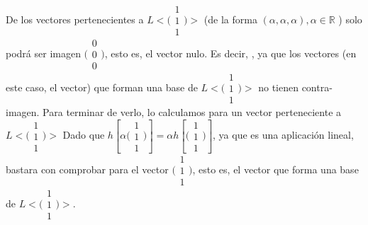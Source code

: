 \documentclass[11pt]{article}
\begin{document}
\begin{question}
\begin{subquestion}
{        De los vectores pertenecientes a $L<\big(\begin{smallmatrix} 1 \\ 1\\ 1 \end{smallmatrix}\big)>$ (de la forma $(\alpha,\alpha,\alpha),\alpha\in\mathbb{R}$ ) solo podrá ser imagen $\big(\begin{smallmatrix} 0 \\ 0\\ 0 \end{smallmatrix}\big)$, esto es, el vector nulo. Es decir, , ya que los vectores (en este caso, el vector) que forman una base de $L<\big(\begin{smallmatrix} 1 \\ 1\\ 1 \end{smallmatrix}\big)>$ no tienen contra-imagen.
        \newline
        \newline
        Para terminar de verlo, lo calculamos para un vector perteneciente a $L<\big(\begin{smallmatrix} 1 \\ 1\\ 1 \end{smallmatrix}\big)>$
        \newline
        Dado que $h\left[\alpha\big(\begin{smallmatrix} 1 \\ 1\\ 1 \end{smallmatrix}\big)\right] = \alpha h\left[\big(\begin{smallmatrix} 1 \\ 1\\ 1 \end{smallmatrix}\big)\right]$, ya que es una aplicación lineal, bastara con comprobar para el vector $\big(\begin{smallmatrix} 1 \\ 1\\ 1 \end{smallmatrix}\big)$, esto es, el vector que forma una base de $L<\big(\begin{smallmatrix} 1 \\ 1\\ 1 \end{smallmatrix}\big)>$.
}
\end{subquestion}
\end{question}
\end{document}
